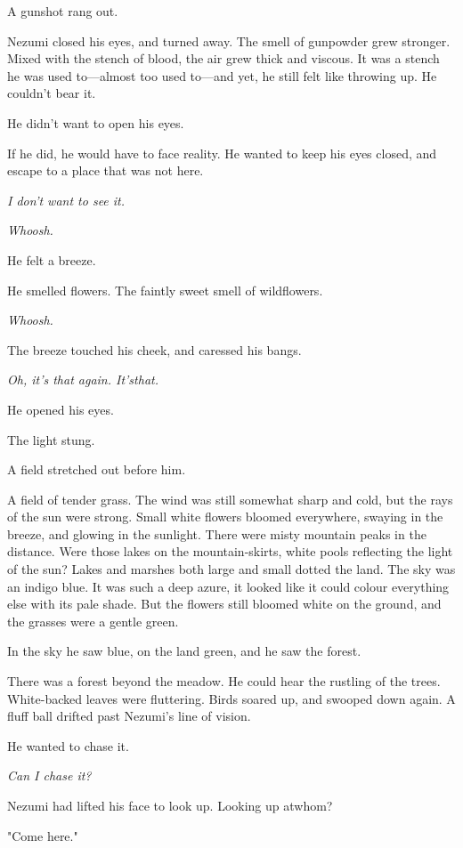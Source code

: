 A gunshot rang out.

Nezumi closed his eyes, and turned away. The smell of gunpowder grew
stronger. Mixed with the stench of blood, the air grew thick and
viscous. It was a stench he was used to---almost too used to---and yet, he
still felt like throwing up. He couldn't bear it.

He didn't want to open his eyes.

If he did, he would have to face reality. He wanted to keep his eyes
closed, and escape to a place that was not here.

\emph{I don't want to see it.}

\mybreak

\emph{Whoosh.}

He felt a breeze.

He smelled flowers. The faintly sweet smell of wildflowers.

\emph{Whoosh.}

The breeze touched his cheek, and caressed his bangs.

\emph{Oh, it's that again. It's\el that.}

He opened his eyes.

The light stung.

A field stretched out before him.

A field of tender grass. The wind was still somewhat sharp and cold, but
the rays of the sun were strong. Small white flowers bloomed everywhere,
swaying in the breeze, and glowing in the sunlight. There were misty
mountain peaks in the distance. Were those lakes on the mountain-skirts,
white pools reflecting the light of the sun? Lakes and marshes both
large and small dotted the land. The sky was an indigo blue. It was such
a deep azure, it looked like it could colour everything else with its
pale shade. But the flowers still bloomed white on the ground, and the
grasses were a gentle green.

In the sky he saw blue, on the land green, and he saw the forest.

There was a forest beyond the meadow. He could hear the rustling of the
trees. White-backed leaves were fluttering. Birds soared up, and swooped
down again. A fluff ball drifted past Nezumi's line of vision.

He wanted to chase it.

\emph{Can I chase it?}

Nezumi had lifted his face to look up. Looking up at\el whom?

"Come here."

